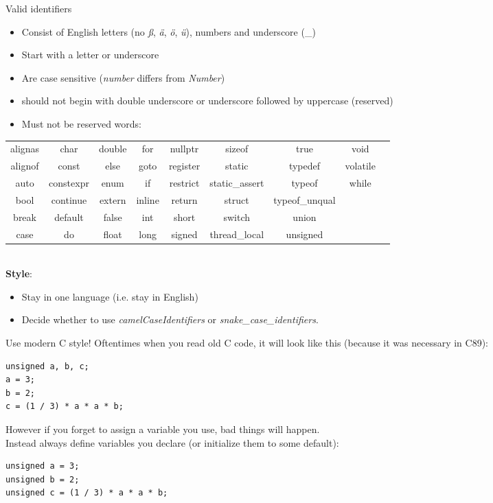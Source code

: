\begin{frame}[fragile]{Valid identifiers}
    \begin{itemize}
        \item Consist of English letters (no \textit{ß}, \textit{ä}, \textit{ö}, \textit{ü}), numbers and underscore (\_)
        \item Start with a letter or underscore
        \item Are case sensitive (\textit{number} differs from \textit{Number})
        \item should not begin with double underscore or underscore followed by uppercase (reserved)
        \item Must not be reserved words:
    \end{itemize}
    {\scriptsize\tt\begin{tabular}{ccccccccc}
alignas     & char      & double    & for       & nullptr   & sizeof            & true          & void \\
alignof     & const     & else      & goto      & register  & static            & typedef       & volatile \\
auto        & constexpr & enum      & if        & restrict  & static\_assert    & typeof        & while \\
bool        & continue  & extern    & inline    & return    & struct            & typeof\_unqual & \\
break       & default   & false     & int       & short     & switch            & union         & \\
case        & do        & float     & long      & signed    & thread\_local     & unsigned      &  
    \end{tabular}}
    \\\bigskip
    \textbf{Style}:\\
    \begin{itemize}
        \item Stay in one language (i.e. stay in English)
        \item Decide whether to use \textit{camelCaseIdentifiers} or \textit{snake\_case\_identifiers}.\\
    \end{itemize}
\end{frame}

\begin{frame}[fragile]{Use modern C style!}
    Oftentimes when you read old C code, it will look like this (because it was necessary in C89):
    \begin{lstlisting}
unsigned a, b, c;
a = 3;
b = 2;
c = (1 / 3) * a * a * b;
\end{lstlisting}

    However if you forget to assign a variable you use, bad things will happen.\\
    \bigskip
    Instead always define variables you declare (or initialize them to some default):
    \begin{lstlisting}
unsigned a = 3;
unsigned b = 2;
unsigned c = (1 / 3) * a * a * b;
\end{lstlisting}
\end{frame}

